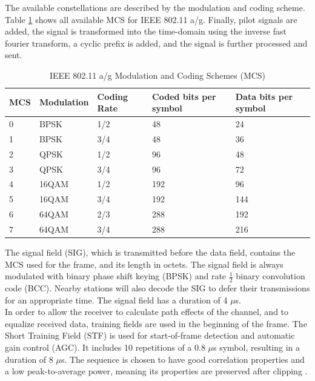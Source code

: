 The available constellations are described by the modulation and coding scheme. Table \ref{tbl:mcs} shows all available MCS for IEEE 802.11 a/g. Finally, pilot signals are added, the signal is transformed into the time-domain using the inverse fast fourier transform, a cyclic prefix is added, and the signal is further processed and sent.

\begin{table}[ht]
	\centering
	\begin{tabular}{|p{2.5cm}|p{2.5cm}|p{2.5cm}|p{2.5cm}|p{2.5cm}|}
		\hline
		\textbf{MCS} & \textbf{Modulation} & \textbf{Coding Rate} & \textbf{Coded bits per symbol} & \textbf{Data bits per symbol} \\ \hline
		0 & BPSK & 1/2 & 48 & 24 \\ \hline
		1 & BPSK & 3/4 & 48 & 36 \\ \hline
		2 & QPSK & 1/2 & 96 & 48 \\ \hline
		3 & QPSK & 3/4 & 96 & 72 \\ \hline
		4 & 16QAM & 1/2 & 192 & 96 \\ \hline
		5 & 16QAM & 3/4 & 192 & 144 \\ \hline
		6 & 64QAM & 2/3 & 288 & 192 \\ \hline
		7 & 64QAM & 3/4 & 288 & 216 \\ \hline
	\end{tabular}
	\caption[IEEE 802.11 a/g Modulation and Coding Schemes]{IEEE 802.11 a/g Modulation and Coding Schemes (MCS) \cite{NEEDED} \label{tbl:mcs}}
\end{table}

The signal field (SIG), which is transmitted before the data field, contains the MCS used for the frame, and its length in octets. The signal field is always modulated with binary phase shift keying (BPSK) and rate $\frac{1}{2}$ binary convolution code (BCC). Nearby stations will also decode the SIG to defer their transmissions for an appropriate time. The signal field has a duration of 4 $\mu$s.\\

In order to allow the receiver to calculate path effects of the channel, and to equalize received data, training fields are used in the beginning of the frame. The Short Training Field (STF) is used for start-of-frame detection and automatic gain control (AGC). It includes 10 repetitions of a 0.8 $\mu$s symbol, resulting in a duration of 8 $\mu$s. The sequence is chosen to have good correlation properties and a low peak-to-average power, meaning its properties are preserved after clipping \cite{perahia2013}.

